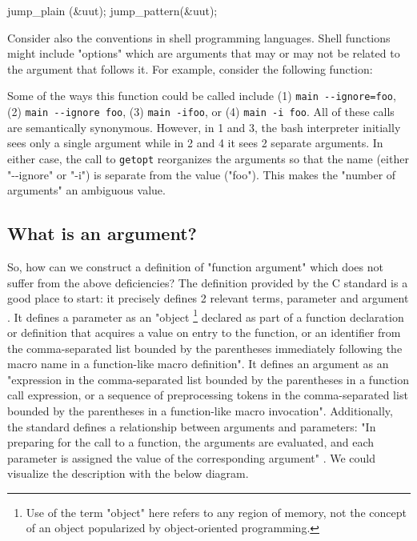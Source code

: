 \begin{pygmented}[lang=rust]
jump_plain  (&uut);
jump_pattern(&uut);
\end{pygmented}

Consider also the conventions in shell programming languages.
Shell functions might include "options" which are arguments that may or may not be related
to the argument that follows it.
For example, consider the following function:



Some of the ways this function could be called include (1) \texttt{main -{}-ignore=foo},
(2) \texttt{main -{}-ignore foo}, (3) \texttt{main -ifoo}, or (4) \texttt{main -i foo}.
All of these calls are semantically synonymous.
However, in 1 and 3, the bash interpreter initially sees only a single argument while in 2
and 4 it sees 2 separate arguments.
In either case, the call to \texttt{getopt} reorganizes the arguments so that the name
(either "-{}-ignore" or "-i") is separate from the value ("foo").
This makes the "number of arguments" an ambiguous value.

\subsection{What is an argument?}

So, how can we construct a definition of "function argument" which does not suffer from
the above deficiencies?
The definition provided by the C standard is a good place to start: it precisely defines 2
relevant terms, parameter and argument
\parencite[][Section 3]{c17}.
It defines a parameter as an
"object
\footnote {
	Use of the term "object" here refers to any region of memory, not the concept of an
	object popularized by object-oriented programming.
}
declared as part of a function declaration or definition that acquires a value on
entry to the function, or an identifier from the comma-separated list bounded by the
parentheses immediately following the macro name in a function-like macro definition".
It defines an argument as an
"expression in the comma-separated list bounded by the parentheses in a function call
expression, or a sequence of preprocessing tokens in the comma-separated list bounded by
the parentheses in a function-like macro invocation".
Additionally, the standard defines a relationship between arguments and parameters:
"In preparing for the call to a function, the arguments are evaluated, and each parameter
is assigned the value of the corresponding argument"
\parencite[][Section 6.5.2.2 paragraph 4]{c17}.
We could visualize the description with the below diagram.

